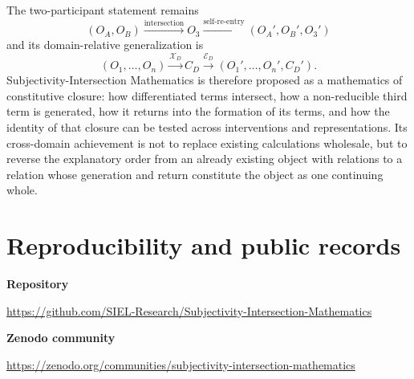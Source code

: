 \documentclass[11pt,a4paper]{article}
\newcommand{\OA}{\ensuremath{O_{A}}}
\newcommand{\OB}{\ensuremath{O_{B}}}
\newcommand{\Othree}{\ensuremath{O_{3}}}
\begin{document}
The two-participant statement remains
\[
 \boxed{(\OA,\OB)\xrightarrow{\text{intersection}}\Othree
 \xrightarrow{\text{self-re-entry}}(\OA',\OB',\Othree')}
\]
and its domain-relative generalization is
\[
 \boxed{(O_1,\ldots,O_n)\xrightarrow{\mathcal X_D}C_D
 \xrightarrow{\mathcal E_D}(O_1',\ldots,O_n',C_D')}.
\]
Subjectivity-Intersection Mathematics is therefore proposed as a mathematics of constitutive closure: how differentiated terms intersect, how a non-reducible third term is generated, how it returns into the formation of its terms, and how the identity of that closure can be tested across interventions and representations. Its cross-domain achievement is not to replace existing calculations wholesale, but to reverse the explanatory order from an already existing object with relations to a relation whose generation and return constitute the object as one continuing whole.

\appendix
\section{Reproducibility and public records}

\noindent\textbf{Repository}
\begin{center}
\small\url{https://github.com/SIEL-Research/Subjectivity-Intersection-Mathematics}
\end{center}

\noindent\textbf{Zenodo community}
\begin{center}
\small\url{https://zenodo.org/communities/subjectivity-intersection-mathematics}
\end{center}
\end{document}
